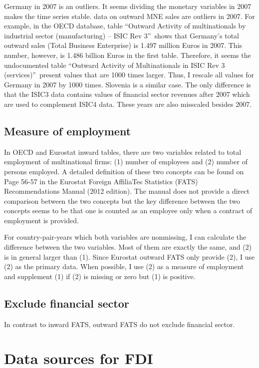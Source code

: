 \documentclass[notitlepage,11pt]{article}%
\begin{document}
Germany in 2007 is an outliers. It seems dividing the monetary variables in
2007 makes the time series stable. data on outward MNE sales are outliers in
2007. For example, in the OECD database, table \textquotedblleft Outward
Activity of multinationals by industrial sector (manufacturing) -- ISIC Rev
3\textquotedblright\ shows that Germany's total outward sales (Total Business
Enterprise) is 1.497 million Euros in 2007. This number, however, is 1.486
billion Euros in the first table. Therefore, it seems the undocumented table
\textquotedblleft Outward Activity of Multinationals in ISIC Rev 3
(services)\textquotedblright\ present values that are 1000 times larger. Thus,
I rescale all values for Germany in 2007 by 1000 times. Slovenia is a similar
case. The only difference is that the ISIC3 data contains values of financial
sector revenues after 2007 which are used to complement ISIC4 data. These
years are also misscaled besides 2007.

\subsection{Measure of employment}

In OECD and Eurostat inward tables, there are two variables related to total
employment of multinational firms: (1) number of employees and (2) number of
persons employed. A detailed definition of these two concepts can be found on
Page 56-57 in the Eurostat Foreign AffiliaTes Statistics (FATS)
Recommendations Manual (2012 edition). The manual does not provide a direct
comparison between the two concepts but the key difference between the two
concepts seems to be that one is counted as an employee only when a contract
of employment is provided.

For country-pair-years which both variables are nonmissing, I can calculate
the difference between the two variables. Most of them are exactly the same,
and (2) is in general larger than (1). Since Eurostat outward FATS only
provide (2), I use (2) as the primary data. When possible, I use (2) as a
measure of employment and supplement (1) if (2) is missing or zero but (1) is positive.

\subsection{Exclude financial sector}

In contrast to inward FATS, outward FATS do not exclude financial sector. 

\section{Data sources for FDI}
\end{document}
